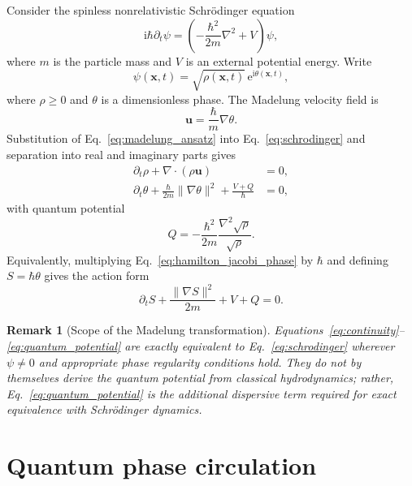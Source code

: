 \documentclass[11pt,a4paper]{article}
\newtheorem{remark}{Remark}
\newcommand{\ii}{\mathrm{i}}
\newcommand{\e}{\mathrm{e}}
\begin{document}
Consider the spinless nonrelativistic Schr\"odinger equation
\begin{equation}
    \ii\hbar\partial_t\psi
    =
    \left(-\frac{\hbar^2}{2m}\nabla^2+V\right)\psi,
    \label{eq:schrodinger}
\end{equation}
where $m$ is the particle mass and $V$ is an external potential energy. Write
\begin{equation}
    \psi(\mathbf{x},t)=\sqrt{\rho(\mathbf{x},t)}\,\e^{\ii\theta(\mathbf{x},t)},
    \label{eq:madelung_ansatz}
\end{equation}
where $\rho\geq 0$ and $\theta$ is a dimensionless phase. The Madelung velocity field is
\begin{equation}
    \mathbf{u}=\frac{\hbar}{m}\nabla\theta.
    \label{eq:madelung_velocity}
\end{equation}
Substitution of Eq.~\eqref{eq:madelung_ansatz} into Eq.~\eqref{eq:schrodinger} and separation into real and imaginary parts gives
\begin{align}
    \partial_t\rho+\nabla\cdot(\rho\mathbf{u}) &= 0,
    \label{eq:continuity}\\
    \partial_t\theta
    +\frac{\hbar}{2m}\lVert\nabla\theta\rVert^2
    +\frac{V+Q}{\hbar} &= 0,
    \label{eq:hamilton_jacobi_phase}
\end{align}
with quantum potential
\begin{equation}
    Q
    =
    -\frac{\hbar^2}{2m}
    \frac{\nabla^2\sqrt{\rho}}{\sqrt{\rho}}.
    \label{eq:quantum_potential}
\end{equation}
Equivalently, multiplying Eq.~\eqref{eq:hamilton_jacobi_phase} by $\hbar$ and defining $S=\hbar\theta$ gives the action form
\begin{equation}
    \partial_t S+\frac{\lVert\nabla S\rVert^2}{2m}+V+Q=0.
    \label{eq:HJ_action}
\end{equation}

\begin{remark}[Scope of the Madelung transformation]
Equations~\eqref{eq:continuity}--\eqref{eq:quantum_potential} are exactly equivalent to Eq.~\eqref{eq:schrodinger} wherever $\psi\neq0$ and appropriate phase regularity conditions hold. They do not by themselves derive the quantum potential from classical hydrodynamics; rather, Eq.~\eqref{eq:quantum_potential} is the additional dispersive term required for exact equivalence with Schr\"odinger dynamics.
\end{remark}

\section{Quantum phase circulation}
\end{document}

